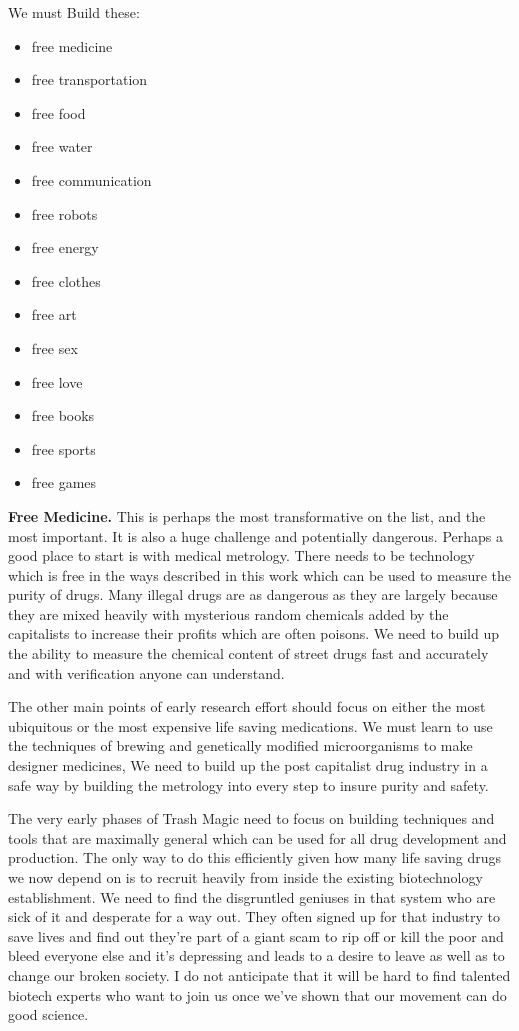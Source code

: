 We must Build these:

\begin{itemize}
\tightlist
\item
  free medicine
\item
  free transportation
\item
  free food
\item
  free water
\item
  free communication
\item
  free robots
\item
  free energy
\item
  free clothes
\item
  free art
\item
  free sex
\item
  free love
\item
  free books
\item
  free sports
\item
  free games
\end{itemize}

\textbf{Free Medicine.} This is perhaps the most transformative on the
list, and the most important. It is also a huge challenge and
potentially dangerous. Perhaps a good place to start is with medical
metrology. There needs to be technology which is free in the ways
described in this work which can be used to measure the purity of drugs.
Many illegal drugs are as dangerous as they are largely because they are
mixed heavily with mysterious random chemicals added by the capitalists
to increase their profits which are often poisons. We need to build up
the ability to measure the chemical content of street drugs fast and
accurately and with verification anyone can understand.

The other main points of early research effort should focus on either
the most ubiquitous or the most expensive life saving medications. We
must learn to use the techniques of brewing and genetically modified
microorganisms to make designer medicines, We need to build up the post
capitalist drug industry in a safe way by building the metrology into
every step to insure purity and safety.

The very early phases of Trash Magic need to focus on building
techniques and tools that are maximally general which can be used for
all drug development and production. The only way to do this efficiently
given how many life saving drugs we now depend on is to recruit heavily
from inside the existing biotechnology establishment. We need to find
the disgruntled geniuses in that system who are sick of it and desperate
for a way out. They often signed up for that industry to save lives and
find out they're part of a giant scam to rip off or kill the poor and
bleed everyone else and it's depressing and leads to a desire to leave
as well as to change our broken society. I do not anticipate that it
will be hard to find talented biotech experts who want to join us once
we've shown that our movement can do good science.

